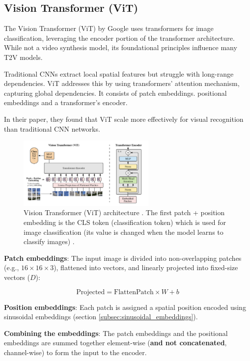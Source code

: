 \subsection{Vision Transformer (ViT)}
\label{appendix:vision_transformer}

The Vision Transformer (ViT) \cite{vision_transformer} by Google uses transformers for image classification, leveraging the encoder portion of the transformer architecture. While not a video synthesis model, its foundational principles influence many T2V models.

Traditional CNNs extract local spatial features but struggle with long-range dependencies. ViT addresses this by using transformers' attention mechanism, capturing global dependencies. It consists of patch embeddings. positional embeddings and a transformer's encoder.

In their paper, they found that ViT scale more effectively for visual recognition than traditional CNN networks.

\begin{figure}
    \centering
    \includegraphics[width=0.6\textwidth]{images/appendix/vision_transformer/architecture.png}
    \caption{Vision Transformer (ViT) architecture \cite{vision_transformer}. The first patch + position embedding is the CLS token (classification token) which is used for image classification (its value is changed when the model learns to classify images) \cite{vision_transformer}.}
\end{figure}

\textbf{Patch embeddings}: The input image is divided into non-overlapping patches (e.g., $16\times 16\times 3$), flattened into vectors, and linearly projected into fixed-size vectors ($D$):

\[ \text{Projected} = \text{FlattenPatch} \times W + b \]

\textbf{Position embeddings}: Each patch is assigned a spatial position encoded using sinusoidal embeddings (section \ref{subsec:sinusoidal_embeddings}).

\textbf{Combining the embeddings}: The patch embeddings and the positional embeddings are summed together element-wise (\textbf{and not concatenated}, channel-wise) to form the input to the encoder.

